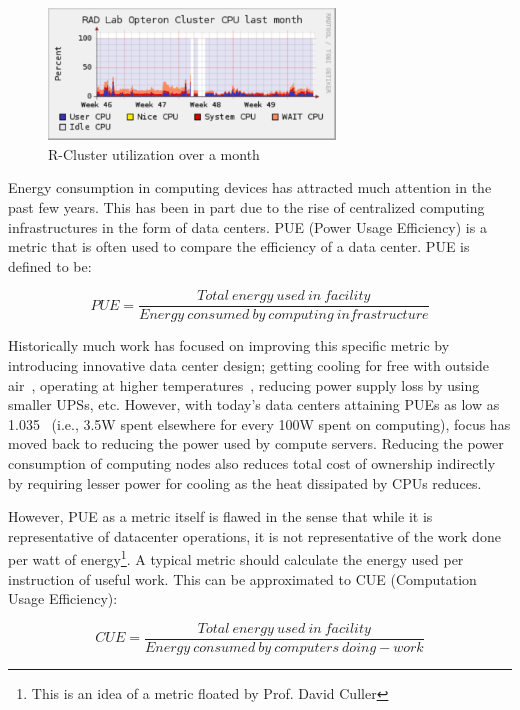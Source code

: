 \begin{figure}[ht]
\centering
\begin{center}
\includegraphics[width=3.0in]{graphs/Rcluster-nov-usage.pdf}
\vspace{-0.1in}
\caption{{\normalsize R-Cluster utilization over a month}\label{fig:r-utilization}}
\vspace{-0.1in}
\end{center}
\end{figure}

Energy consumption in computing devices has attracted much attention in the past few years. This has been in part due to the rise of centralized computing infrastructures in the form of data centers. PUE (Power Usage Efficiency) is a metric that is often used to compare the efficiency of a data center. PUE is defined to be:
\begin{scriptsize}
    \begin{equation}
        PUE = \frac{Total~energy~used~in~facility}{Energy~consumed~by~computing~infrastructure}
        \label{eq:pue}
    \end{equation}
\end{scriptsize}
Historically much work has focused on improving this specific metric by introducing innovative data center design; getting cooling for free with outside air~\cite{Neil:06}, operating at higher temperatures~\cite{Ratnesh:05}, reducing power supply loss by using smaller UPSs, etc. However, with today's data centers attaining PUEs as low as 1.035~\cite{Sandia:09} (i.e., 3.5W spent elsewhere for every 100W spent on computing), focus has moved back to reducing the power used by compute servers. Reducing the power consumption of computing nodes also reduces total cost of ownership indirectly~\cite{Luiz:07} by requiring lesser power for cooling as the heat dissipated by CPUs reduces.

However, PUE as a metric itself is flawed in the sense that while it is representative of datacenter operations, it is not representative of the work done per watt of energy\footnote{This is an idea of a metric floated by Prof. David Culler}. A typical metric should calculate the energy used per instruction of useful work. This can be approximated to CUE (Computation Usage Efficiency):
\begin{scriptsize}
    \begin{equation}
        CUE = \frac{Total~energy~used~in~facility}{Energy~consumed~by~computers~doing-work}
        \label{eq:cue}
    \end{equation}
\end{scriptsize}

